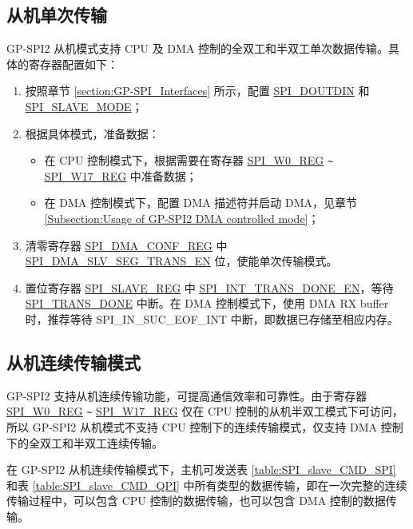 \documentclass[main\_\_CN.tex]{subfiles}
\begin{document}
\subsection{从机单次传输}\label{GP-SPI2 slave mode single transfer}


GP-SPI2 从机模式支持 CPU 及 DMA 控制的全双工和半双工单次数据传输。具体的寄存器配置如下：
\begin{enumerate}
    \item 按照章节  \ref{section:GP-SPI_Interfaces} 所示，配置 \hyperref[fielddesc:SPIDOUTDIN]{SPI\_DOUTDIN} 和 \hyperref[fielddesc:SPISLAVEMODE]{SPI\_SLAVE\_MODE}；

    \item 根据具体模式，准备数据：
    \begin{itemize}
        \item 在 CPU 控制模式下，根据需要在寄存器 \hyperref[regdesc:SPIW0REG]{SPI\_W0\_REG} \verb+~+ \hyperref[regdesc:SPIW17REG]{SPI\_W17\_REG} 中准备数据；
        \item 在 DMA 控制模式下，配置 DMA 描述符并启动 DMA，见章节 \ref{Subsection:Usage of GP-SPI2 DMA controlled mode}；
    \end{itemize}

    \item 清零寄存器 \hyperref[regdesc:SPIDMACONFREG]{SPI\_DMA\_CONF\_REG} 中 \hyperref[fielddesc:SPIDMASLVSEGTRANSEN]{SPI\_DMA\_SLV\_SEG\_TRANS\_EN} 位，使能单次传输模式。

    \item 置位寄存器 \hyperref[regdesc:SPISLAVEREG]{SPI\_SLAVE\_REG} 中 \hyperref[fielddesc:SPIINTTRANSDONEEN]{SPI\_INT\_TRANS\_DONE\_EN}，等待 \hyperref[fielddesc:SPITRANSDONE]{SPI\_TRANS\_DONE} 中断。在 DMA 控制模式下，使用 DMA RX buffer 时，推荐等待 SPI\_IN\_SUC\_EOF\_INT 中断，即数据已存储至相应内存。
\end{enumerate}

\subsection{从机连续传输模式}\label{GP-SPI2 slave seg-trans}

GP-SPI2 支持从机连续传输功能，可提高通信效率和可靠性。由于寄存器 \hyperref[regdesc:SPIW0REG]{SPI\_W0\_REG} \verb+~+ \hyperref[regdesc:SPIW17REG]{SPI\_W17\_REG} 仅在 CPU 控制的从机半双工模式下可访问，所以 GP-SPI2 从机模式不支持 CPU 控制下的连续传输模式，仅支持 DMA 控制下的全双工和半双工连续传输。

在 GP-SPI2 从机连续传输模式下，主机可发送表 \ref{table:SPI_slave_CMD_SPI} 和表 \ref{table:SPI_slave_CMD_QPI} 中所有类型的数据传输，即在一次完整的连续传输过程中，可以包含 CPU 控制的数据传输，也可以包含 DMA 控制的数据传输。
\end{document}
